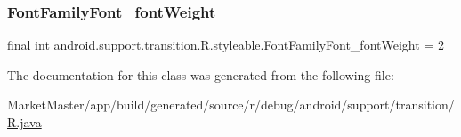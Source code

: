 \mbox{\label{classandroid_1_1support_1_1transition_1_1R_1_1styleable_ac169fcd6c0a602cbbc9306606e16ab9a}} 
\subsubsection{\texorpdfstring{Font\+Family\+Font\+\_\+font\+Weight}{FontFamilyFont\_fontWeight}}
{\footnotesize\ttfamily final int android.\+support.\+transition.\+R.\+styleable.\+Font\+Family\+Font\+\_\+font\+Weight = 2\hspace{0.3cm}{\ttfamily [static]}}



The documentation for this class was generated from the following file\+:\begin{DoxyCompactItemize}
\item 
Market\+Master/app/build/generated/source/r/debug/android/support/transition/\mbox{\hyperlink{debug_2android_2support_2transition_2R_8java}{R.\+java}}\end{DoxyCompactItemize}
